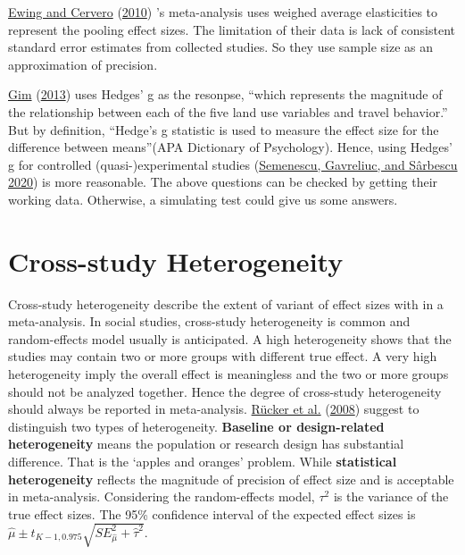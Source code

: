 \documentclass[
  11pt,
  openany]{memoir}
\begin{document}
\protect\hyperlink{ref-ewingTravelBuiltEnvironment2010}{Ewing and Cervero} (\protect\hyperlink{ref-ewingTravelBuiltEnvironment2010}{2010}) 's meta-analysis uses weighed average elasticities to represent the pooling effect sizes.
The limitation of their data is lack of consistent standard error estimates from collected studies.
So they use sample size as an approximation of precision.

\protect\hyperlink{ref-gimRelationshipsLandUse2013}{Gim} (\protect\hyperlink{ref-gimRelationshipsLandUse2013}{2013}) uses Hedges' g as the resonpse, ``which represents the magnitude of the relationship between each of the five land use variables and travel behavior.''
But by definition, ``Hedge's g statistic is used to measure the effect size for the difference between means''(APA Dictionary of Psychology).
Hence, using Hedges' g for controlled (quasi-)experimental studies (\protect\hyperlink{ref-semenescu30YearsSoft2020}{Semenescu, Gavreliuc, and Sârbescu 2020}) is more reasonable.
The above questions can be checked by getting their working data.
Otherwise, a simulating test could give us some answers.

\hypertarget{cross-study-heterogeneity}{%
\section{Cross-study Heterogeneity}\label{cross-study-heterogeneity}}

Cross-study heterogeneity describe the extent of variant of effect sizes with in a meta-analysis.
In social studies, cross-study heterogeneity is common and random-effects model usually is anticipated.
A high heterogeneity shows that the studies may contain two or more groups with different true effect.
A very high heterogeneity imply the overall effect is meaningless and the two or more groups should not be analyzed together.
Hence the degree of cross-study heterogeneity should always be reported in meta-analysis.
\protect\hyperlink{ref-ruckerUndueRelianceI22008}{Rücker et al.} (\protect\hyperlink{ref-ruckerUndueRelianceI22008}{2008}) suggest to distinguish two types of heterogeneity.
\textbf{Baseline or design-related heterogeneity} means the population or research design has substantial difference.
That is the `apples and oranges' problem.
While \textbf{statistical heterogeneity} reflects the magnitude of precision of effect size and is acceptable in meta-analysis.
Considering the random-effects model, \(\tau^2\) is the variance of the true effect sizes.
The 95\% confidence interval of the expected effect sizes is \(\hat\mu \pm t_{K-1, 0.975}\sqrt{SE_{\hat\mu}^2+\hat\tau^2}\).
\end{document}
